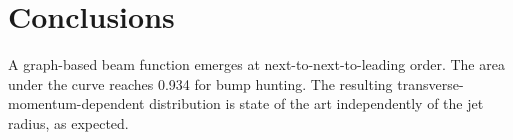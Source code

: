 \section{Conclusions}\label{sec:conclusions}

A graph-based beam function emerges at next-to-next-to-leading order.
The area under the curve reaches 0.934 for bump hunting. The resulting
transverse-momentum-dependent distribution is state of the art
independently of the jet radius, as expected.


